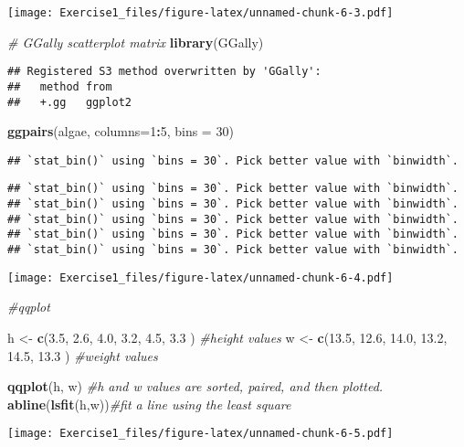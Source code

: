 \documentclass[
]{article}
\newenvironment{Shaded}{\begin{snugshade}}{\end{snugshade}}
\newcommand{\AttributeTok}[1]{\textcolor[rgb]{0.13,0.29,0.53}{#1}}
\newcommand{\CommentTok}[1]{\textcolor[rgb]{0.56,0.35,0.01}{\textit{#1}}}
\newcommand{\DecValTok}[1]{\textcolor[rgb]{0.00,0.00,0.81}{#1}}
\newcommand{\FloatTok}[1]{\textcolor[rgb]{0.00,0.00,0.81}{#1}}
\newcommand{\FunctionTok}[1]{\textcolor[rgb]{0.13,0.29,0.53}{\textbf{#1}}}
\newcommand{\NormalTok}[1]{#1}
\newcommand{\OtherTok}[1]{\textcolor[rgb]{0.56,0.35,0.01}{#1}}
\newcommand{\SpecialCharTok}[1]{\textcolor[rgb]{0.81,0.36,0.00}{\textbf{#1}}}
\begin{document}
\texttt{[image: Exercise1\_files/figure-latex/unnamed-chunk-6-3.pdf]}

\begin{Shaded}
\begin{Highlighting}[]
\CommentTok{\# GGally scatterplot matrix}
\FunctionTok{library}\NormalTok{(GGally)}
\end{Highlighting}
\end{Shaded}

\begin{verbatim}
## Registered S3 method overwritten by 'GGally':
##   method from   
##   +.gg   ggplot2
\end{verbatim}

\begin{Shaded}
\begin{Highlighting}[]
\FunctionTok{ggpairs}\NormalTok{(algae, }\AttributeTok{columns=}\DecValTok{1}\SpecialCharTok{:}\DecValTok{5}\NormalTok{, }\AttributeTok{bins =} \DecValTok{30}\NormalTok{)}
\end{Highlighting}
\end{Shaded}

\begin{verbatim}
## `stat_bin()` using `bins = 30`. Pick better value with `binwidth`.
\end{verbatim}

\begin{verbatim}
## `stat_bin()` using `bins = 30`. Pick better value with `binwidth`.
## `stat_bin()` using `bins = 30`. Pick better value with `binwidth`.
## `stat_bin()` using `bins = 30`. Pick better value with `binwidth`.
## `stat_bin()` using `bins = 30`. Pick better value with `binwidth`.
## `stat_bin()` using `bins = 30`. Pick better value with `binwidth`.
\end{verbatim}

\texttt{[image: Exercise1\_files/figure-latex/unnamed-chunk-6-4.pdf]}

\begin{Shaded}
\begin{Highlighting}[]
\CommentTok{\#qqplot}

\NormalTok{h }\OtherTok{\textless{}{-}} \FunctionTok{c}\NormalTok{(}\FloatTok{3.5}\NormalTok{, }\FloatTok{2.6}\NormalTok{, }\FloatTok{4.0}\NormalTok{, }\FloatTok{3.2}\NormalTok{, }\FloatTok{4.5}\NormalTok{, }\FloatTok{3.3}\NormalTok{ ) }\CommentTok{\#height values}
\NormalTok{w }\OtherTok{\textless{}{-}} \FunctionTok{c}\NormalTok{(}\FloatTok{13.5}\NormalTok{, }\FloatTok{12.6}\NormalTok{, }\FloatTok{14.0}\NormalTok{, }\FloatTok{13.2}\NormalTok{, }\FloatTok{14.5}\NormalTok{, }\FloatTok{13.3}\NormalTok{ ) }\CommentTok{\#weight values}

\FunctionTok{qqplot}\NormalTok{(h, w) }\CommentTok{\#h and w values are sorted, paired, and then plotted.}
\FunctionTok{abline}\NormalTok{(}\FunctionTok{lsfit}\NormalTok{(h,w))}\CommentTok{\#fit a line using the least square}
\end{Highlighting}
\end{Shaded}

\texttt{[image: Exercise1\_files/figure-latex/unnamed-chunk-6-5.pdf]}
\end{document}
